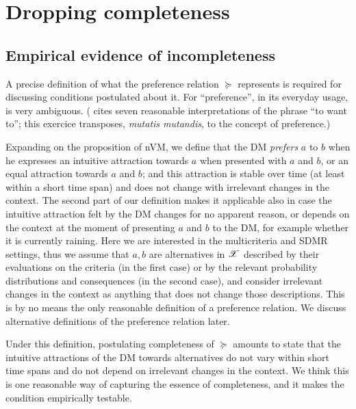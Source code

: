 \documentclass[french, english]{llncs}
\begin{document}
	\section{Dropping completeness}
	
	\subsection{Empirical evidence of incompleteness}
	A precise definition of what the preference relation $\succeq$ represents is required for discussing conditions postulated about it. For “preference”, in its everyday usage, is very ambiguous. (\citet{frankfurt_freedom_1971} cites seven reasonable interpretations of the phrase “to want to”; this exercice transposes, \emph{mutatis mutandis}, to the concept of preference.)
	
	Expanding on the proposition of nVM, we define that the \ac{DM} \emph{prefers} $a$ to $b$ when he expresses an intuitive attraction towards $a$ when presented with $a$ and $b$, or an equal attraction towards $a$ and $b$; and this attraction is stable over time (at least within a short time span) and does not change with irrelevant changes in the context. The second part of our definition makes it applicable also in case the intuitive attraction felt by the \ac{DM} changes for no apparent reason, or depends on the context at the moment of presenting $a$ and $b$ to the \ac{DM}, for example whether it is currently raining. Here we are interested in the multicriteria and SDMR settings, thus we assume that $a, b$ are alternatives in $\mathscr{X}$ described by their evaluations on the criteria (in the first case) or by the relevant probability distributions and consequences (in the second case), and consider irrelevant changes in the context as anything that does not change those descriptions. 
	This is by no means the only reasonable definition of a preference relation. We discuss alternative definitions of the preference relation later.
	
	Under this definition, postulating completeness of $\succeq$ amounts to state that the intuitive attractions of the \ac{DM} towards alternatives do not vary within short time spans and do not depend on irrelevant changes in the context. We think this is one reasonable way of capturing the essence of completeness, and it makes the condition empirically testable.
	
\end{document}
